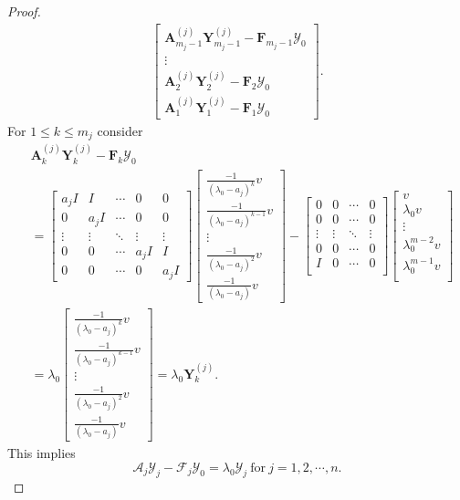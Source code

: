 \documentclass[12pt, reqno]{amsart}
\theoremstyle{definition}
\theoremstyle{remark}
\numberwithin{equation}{section}
\begin{document}
\begin{proof}
\begin{align*}
\begin{bmatrix}
\textbf{A}_{m_j-1}^{(j)}\textbf{Y}_{m_j-1}^{(j)}-\textbf{F}_{m_j-1}\mathcal{Y}_0\\
\vdots\\
\textbf{A}_2^{(j)}\textbf{Y}_2^{(j)}-\textbf{F}_2\mathcal{Y}_0\\
\textbf{A}_1^{(j)}\textbf{Y}_1^{(j)}-\textbf{F}_1\mathcal{Y}_0
\end{bmatrix}.
\end{align*} 
For $1 \leq k \leq m_j$ consider  
\begin{align*}
& \textbf{A}_k^{(j)}\textbf{Y}_k^{(j)}-\textbf{F}_k\mathcal{Y}_0 \nonumber\\
& = \begin{bmatrix}
a_jI & I & \cdots & 0 & 0 \\
0 & a_jI  & \cdots & 0 & 0 \\
\vdots & \vdots & \ddots & \vdots & \vdots \\
0 & 0 & \cdots & a_jI & I \\
0 & 0 & \cdots & 0 & a_jI
\end{bmatrix} \begin{bmatrix}
\frac{-1}{(\lambda_0-a_j)^k} v\\
\frac{-1}{(\lambda_0-a_j)^{k-1}} v\\
\vdots\\
\frac{-1}{(\lambda_0-a_j)^2}v\\
\frac{-1}{(\lambda_0-a_j)}v
\end{bmatrix}-\begin{bmatrix}
0 & 0 & \cdots & 0\\
0 & 0 & \cdots & 0\\
\vdots & \vdots & \ddots & \vdots \\
0 & 0 & \cdots &  0 \\
I & 0 & \cdots & 0 \\
\end{bmatrix} \begin{bmatrix}
v\\
\lambda_0v\\
\vdots\\
\lambda_0^{m-2}v \\
\lambda_0^{m-1}v\\
\end{bmatrix} \nonumber\\ 
& = \lambda_0 \begin{bmatrix}
\frac{-1}{(\lambda_0-a_j)^k} v\\
\frac{-1}{(\lambda_0-a_j)^{k-1}} v\\
\vdots\\
\frac{-1}{(\lambda_0-a_j)^2}v\\
\frac{-1}{(\lambda_0-a_j)}v
\end{bmatrix} = \lambda_0 \textbf{Y}_k^{(j)}. 
\end{align*}
This implies 
\begin{equation}
\mathcal{A}_{j} \mathcal{Y}_j-\mathcal{F}_{j}\mathcal{Y}_0  =\lambda_0 
\mathcal{Y}_j  \ \text{for} \ j= 1, 2, \cdots, n. 
\end{equation}


\end{proof}
\end{document}

